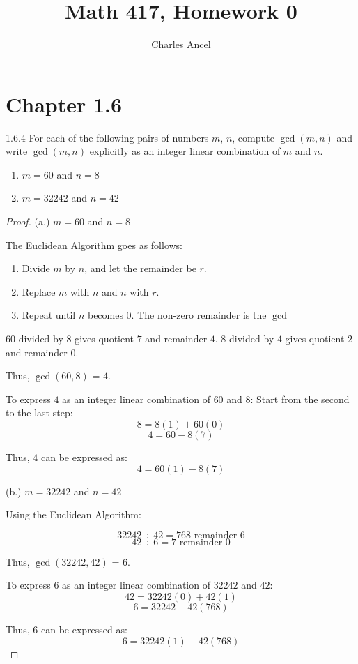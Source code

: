\documentclass[12pt]{amsart}
\title{Math 417, Homework 0}
\author{Charles Ancel}
\theoremstyle{definition}
\numberwithin{equation}{section}
\theoremstyle{plain}
\begin{document}
\maketitle

\section*{Chapter 1.6}
\begin{exercise}{1.6.4}
    For each of the following pairs of numbers $m$, $n$, compute $\gcd(m, n)$ and write $\gcd(m, n)$ explicitly as an integer linear combination of $m$ and $n$.
\begin{enumerate}[label=(\alph*.)]
    \item $m = 60$ and $n = 8$
    \item $m = 32242$ and $n = 42$
\end{enumerate}
    \begin{proof}
(a.) \(m = 60\) and \(n = 8\)

The Euclidean Algorithm goes as follows:
\begin{enumerate}
    \item Divide \(m\) by \(n\), and let the remainder be \(r\). 
    \item Replace \(m\) with \(n\) and \(n\) with \(r\). 
    \item Repeat until \(n\) becomes 0. The non-zero remainder is the $\gcd$
\end{enumerate}

\(60\) divided by \(8\) gives quotient \(7\) and remainder \(4\).
\(8\) divided by \(4\) gives quotient \(2\) and remainder \(0\).

Thus, $\gcd(60,8)$ = \(4\).

To express \(4\) as an integer linear combination of \(60\) and \(8\):
Start from the second to the last step:
\[ 8 = 8(1) + 60(0) \]
\[ 4 = 60 - 8(7) \]

Thus, \(4\) can be expressed as: 
\[ 4 = 60(1) - 8(7) \]

(b.) \(m = 32242\) and \(n = 42\)

Using the Euclidean Algorithm:

\[ 32242 \div 42 = 768 \text{ remainder } 6 \]
\[ 42 \div 6 = 7 \text{ remainder } 0 \]

Thus, $\gcd(32242,42)$ = \(6\).

To express \(6\) as an integer linear combination of \(32242\) and \(42\):
\[ 42 = 32242(0) + 42(1) \]
\[ 6 = 32242 - 42(768) \]

Thus, \(6\) can be expressed as: 
\[ 6 = 32242(1) - 42(768) \]
    \end{proof}
    
\end{exercise}
\end{document}
